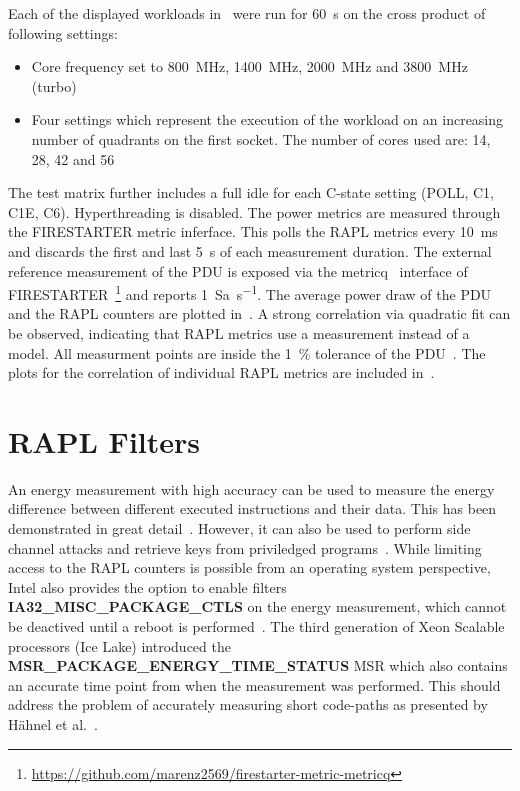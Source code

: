 Each of the displayed workloads in~ were run for \SI{60}{\second} on the cross product of following settings:
\begin{itemize}
    \item Core frequency set to \SI{800}{\MHz}, \SI{1400}{\MHz}, \SI{2000}{\MHz} and \SI{3800}{\MHz} (turbo)
    \item Four settings which represent the execution of the workload on an increasing number of quadrants on the first socket.
    The number of cores used are: \SI{14}{}, \SI{28}{}, \SI{42}{} and \SI{56}{}
\end{itemize}
The test matrix further includes a full idle for each C-state setting (POLL, C1, C1E, C6).
Hyperthreading is disabled.
The power metrics are measured through the FIRESTARTER metric inferface.
This polls the \ac{RAPL} metrics every \SI{10}{\ms} and discards the first and last \SI{5}{\second} of each measurement duration.
The external reference measurement of the \ac{PDU} is exposed via the metricq~\cite{Ilsche_2019_MetricQ} interface of FIRESTARTER~\footnote{\url{https://github.com/marenz2569/firestarter-metric-metricq}} and reports \SI{1}{Sa\per\second}.
The average power draw of the \ac{PDU} and the \ac{RAPL} counters are plotted in~.
A strong correlation via quadratic fit can be observed, indicating that RAPL metrics use a measurement instead of a model.
All measurment points are inside the \SI{1}{\percent} tolerance of the \ac{PDU}~\cite{Raritan_PX2_5528}.
The plots for the correlation of individual \ac{RAPL} metrics are included in~.

\section{RAPL Filters}
\label{sec:rapl_filters}

An energy measurement with high accuracy can be used to measure the energy difference between different executed instructions and their data.
This has been demonstrated in great detail~\cite{Lucas_2016_AluPower,Schoene_2024_Alder_Lake,Schoene_2021_Zen2}.
However, it can also be used to perform side channel attacks and retrieve keys from priviledged programs~\cite{Lipp_2021_Platypus}.
While limiting access to the \ac{RAPL} counters is possible from an operating system perspective, Intel also provides the option to enable filters \textbf{IA32\_MISC\_PACKAGE\_CTLS} on the energy measurement, which cannot be deactived until a reboot is performed~\cite[Vol. 4 Table 2-52]{intel_combined_software_developer_manual}.
The third generation of Xeon Scalable processors (Ice Lake) introduced the \textbf{MSR\_PACKAGE\_ENERGY\_TIME\_STATUS} MSR which also contains an accurate time point from when the measurement was performed.
This should address the problem of accurately measuring short code-paths as presented by Hähnel et al.~\cite{Haehnel_2012_RAPL}.

